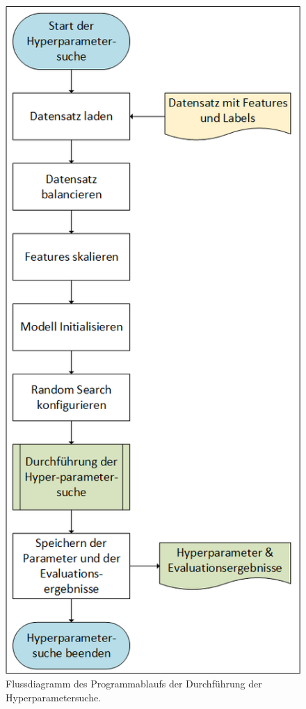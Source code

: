 \begin{figure}[p]
    \centering
    \includegraphics[height=0.9\textheight]{img/Grafiken/Flussdaigramm Hyperparametersuche.png}
    \caption{Flussdiagramm des Programmablaufs der Durchführung der Hyperparametersuche.}
    \label{fig:FlussDia Hyperpara}
\end{figure}

